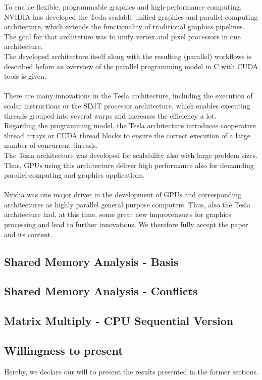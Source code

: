 \documentclass[12pt]{article}
\begin{document}
To enable flexible, programmable graphics and high-performance computing, NVIDIA has developed the Tesla scalable unified graphics and parallel computing architecture, which extends the functionality of traditional graphics pipelines. The goal for that architeture was to unify vertex and pixel processors in one architecture.\\
The developed architecture itself along with the resulting (parallel) workflows is described before an overview of the parallel programming model in C with CUDA tools is given.\\\\
There are many innovations in the Tesla architecture, including the execution of scalar instructions or the SIMT processor architecture, which enables executing threads grouped into several warps and increases the efficiency a lot.\\
Regarding the programming model, the Tesla architecture introduces cooperative thread arrays or CUDA thread blocks to ensure the correct execution of a large number of concurrent threads.\\
The Tesla architecture was developed for scalability also with large problem sizes. Thus, GPUs using this architecture deliver high performance also for demanding parallel-computing and graphics applications. \\\\
Nvidia was one major driver in the development of GPUs and corresponding architectures as highly parallel general purpose computers. Thus, also the Tesla architecture had, at this time, some great new improvements for graphics processing and lead to further innovations. We therefore fully accept the paper and its content.
\vspace{10pt}

\subsection{Shared Memory Analysis - Basis}

\subsection{Shared Memory Analysis - Conflicts}

\subsection{Matrix Multiply - CPU Sequential Version}

\subsection{Willingness to present}
Hereby, we declare our will to present the results presented in the former sections.
\end{document}

